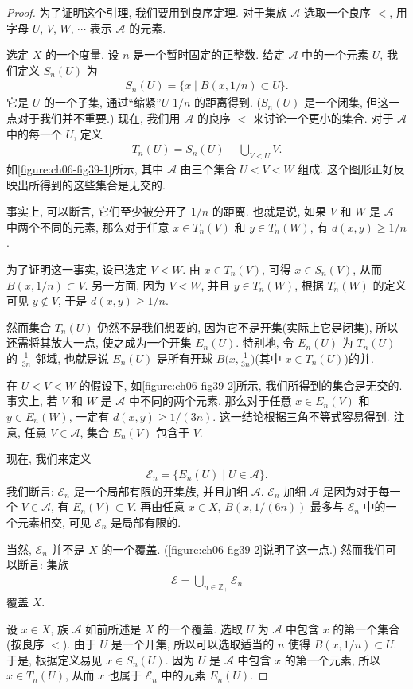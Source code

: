 \documentclass[../../main.tex]{subfiles}
\begin{document}
\begin{proof}
为了证明这个引理, 我们要用到良序定理. 对于集族 $\mathcal{A}$ 选取一个良序 $<$, 用字母 $U$, $V$, $W$, $\cdots$ 表示 $\mathcal{A}$ 的元素.

选定 $X$ 的一个度量. 设 $n$ 是一个暂时固定的正整数. 给定 $\mathcal{A}$ 中的一个元素 $U$, 我们定义 $S_n(U)$ 为
\begin{align*}
S_n(U)=\{x\mid B(x,1/n)\subset U\}.
\end{align*}
它是 $U$ 的一个子集, 通过``缩紧''$U$ $1/n$ 的距离得到. ($S_n(U)$ 是一个闭集, 但这一点对于我们并不重要.) 现在, 我们用 $\mathcal{A}$ 的良序 $<$ 来讨论一个更小的集合. 对于 $\mathcal{A}$ 中的每一个 $U$, 定义
\begin{align*}
T_n(U)=S_n(U)-\bigcup_{V<U}V.
\end{align*}
如\cref{figure:ch06-fig39-1}所示, 其中 $\mathcal{A}$ 由三个集合 $U<V<W$ 组成. 这个图形正好反映出所得到的这些集合是无交的.


事实上, 可以断言, 它们至少被分开了 $1/n$ 的距离. 也就是说, 如果 $V$ 和 $W$ 是 $\mathcal{A}$ 中两个不同的元素, 那么对于任意 $x\in T_n(V)$ 和 $y\in T_n(W)$, 有 $d(x,y)\geqslant 1/n$.

为了证明这一事实, 设已选定 $V<W$. 由 $x\in T_n(V)$, 可得 $x\in S_n(V)$, 从而 $B(x,1/n)\subset V$. 另一方面, 因为 $V<W$, 并且 $y\in T_n(W)$, 根据 $T_n(W)$ 的定义可见 $y\notin V$, 于是 $d(x,y)\geqslant 1/n$.

然而集合 $T_n(U)$ 仍然不是我们想要的, 因为它不是开集(实际上它是闭集), 所以还需将其放大一点, 使之成为一个开集 $E_n(U)$. 特别地, 令 $E_n(U)$ 为 $T_n(U)$ 的 $\tfrac{1}{3n}$-邻域, 也就是说 $E_n(U)$ 是所有开球 $B\bigl(x,\tfrac{1}{3n}\bigr)$(其中 $x\in T_n(U)$)的并.

在 $U<V<W$ 的假设下, 如\cref{figure:ch06-fig39-2}所示, 我们所得到的集合是无交的. 事实上, 若 $V$ 和 $W$ 是 $\mathcal{A}$ 中不同的两个元素, 那么对于任意 $x\in E_n(V)$ 和 $y\in E_n(W)$, 一定有 $d(x,y)\geqslant 1/(3n)$. 这一结论根据三角不等式容易得到. 注意, 任意 $V\in\mathcal{A}$, 集合 $E_n(V)$ 包含于 $V$.


现在, 我们来定义
\begin{align*}
\mathcal{E}_n=\{E_n(U)\mid U\in\mathcal{A}\}.
\end{align*}
我们断言: $\mathcal{E}_n$ 是一个局部有限的开集族, 并且加细 $\mathcal{A}$. $\mathcal{E}_n$ 加细 $\mathcal{A}$ 是因为对于每一个 $V\in\mathcal{A}$, 有 $E_n(V)\subset V$. 再由任意 $x\in X$, $B(x,1/(6n))$ 最多与 $\mathcal{E}_n$ 中的一个元素相交, 可见 $\mathcal{E}_n$ 是局部有限的.

当然, $\mathcal{E}_n$ 并不是 $X$ 的一个覆盖. (\cref{figure:ch06-fig39-2}说明了这一点.) 然而我们可以断言: 集族
\begin{align*}
\mathcal{E}=\bigcup_{n\in\mathbb{Z}_+}\mathcal{E}_n
\end{align*}
覆盖 $X$.

设 $x\in X$, 族 $\mathcal{A}$ 如前所述是 $X$ 的一个覆盖. 选取 $U$ 为 $\mathcal{A}$ 中包含 $x$ 的第一个集合(按良序 $<$). 由于 $U$ 是一个开集, 所以可以选取适当的 $n$ 使得 $B(x,1/n)\subset U$. 于是, 根据定义易见 $x\in S_n(U)$. 因为 $U$ 是 $\mathcal{A}$ 中包含 $x$ 的第一个元素, 所以 $x\in T_n(U)$, 从而 $x$ 也属于 $\mathcal{E}_n$ 中的元素 $E_n(U)$.
\end{proof}
\end{document}
